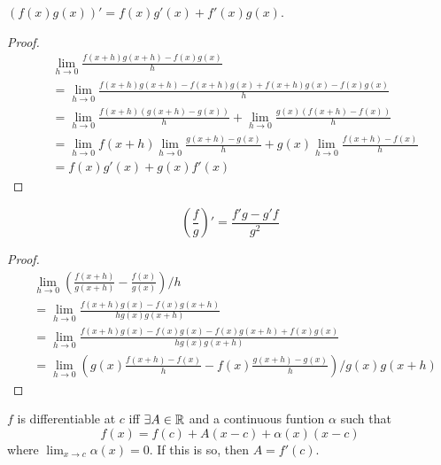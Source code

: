 \documentclass[a4paper,10pt]{article}
\begin{document}
\begin{lemma}
	$(f(x)g(x))' = f(x)g'(x) + f'(x)g(x)$.
\end{lemma}

\begin{proof}
	\begin{align*}
		&\lim_{h \to 0} \frac{f(x+h)g(x+h) - f(x)g(x)}{h} \\
		&= \lim_{h \to 0} \frac{f(x+h)g(x+h) - f(x+h)g(x) + f(x+h)g(x) - f(x)g(x)}{h} \\
		&= \lim_{h \to 0} \frac{f(x+h)(g(x+h) - g(x))}{h}
		+ \lim_{h \to 0} \frac{g(x)(f(x+h) - f(x))}{h} \\
		&= \lim_{h \to 0} f(x+h) \lim_{h \to 0} \frac{g(x+h) - g(x)}{h}
		+ g(x) \lim_{h \to 0} \frac{f(x+h) - f(x)}{h} \\
		&= f(x)g'(x) + g(x)f'(x)
	\end{align*}
\end{proof}

\begin{lemma}
	\[ \left( \frac{f}{g} \right)' = \frac{f'g - g'f}{g^2} \]
\end{lemma}

\begin{proof}
	\begin{align*}
		&\lim_{h \to 0} \left(\frac{f(x+h)}{g(x+h)} - \frac{f(x)}{g(x)}\right)/h \\
		&= \lim_{h \to 0} \frac{f(x+h)g(x) - f(x)g(x+h)}{hg(x)g(x+h)} \\
		&= \lim_{h \to 0} \frac{f(x+h)g(x) - f(x)g(x) - f(x)g(x+h) + f(x)g(x)}{hg(x)g(x+h)} \\
		&= \lim_{h \to 0} \left(
			g(x)\frac{f(x+h) - f(x)}{h} - f(x)\frac{g(x+h) - g(x)}{h}
		\right)/g(x)g(x+h)
	\end{align*}
\end{proof}

\begin{lemma}
	$f$ is differentiable at $c$ iff $\exists A \in \mathbb{R}$ and a continuous funtion $\alpha$ such that
	\[ f(x) = f(c) + A(x-c) + \alpha(x)(x-c) \]
	where $\lim_{x \to c} \alpha(x) = 0$.
	If this is so, then $A = f'(c)$.
\end{lemma}
\end{document}
